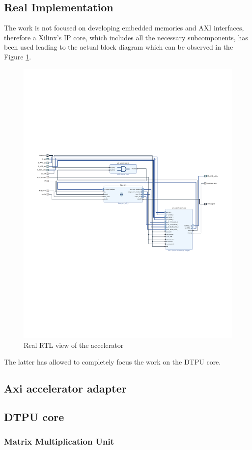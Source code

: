 \subsection{Real Implementation}
The work is not focused on developing embedded memories and AXI interfaces, therefore a Xilinx's IP core, which includes all the necessary subcomponents, has been used\cite{paper:43} leading to the actual block diagram which can be observed in the Figure \ref{fig:rtlaccel}.
\begin{figure}[H]
\centering
\captionsetup{justification=centering}
\includegraphics[scale=1,angle=90]{./figure/accelerator_schematic.pdf}
\caption{Real RTL view of the accelerator}
\label{fig:rtlaccel}
\end{figure} 
The latter has allowed to completely focus the work on the DTPU core.
\newpage
\subsection{Axi accelerator adapter}
\subsection{DTPU core}

\subsubsection{Matrix Multiplication Unit}









